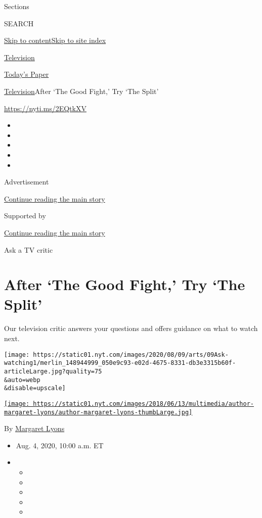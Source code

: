 Sections

SEARCH

\protect\hyperlink{site-content}{Skip to
content}\protect\hyperlink{site-index}{Skip to site index}

\href{https://www.nytimes.com/section/arts/television}{Television}

\href{https://myaccount.nytimes.com/auth/login?response_type=cookie\&client_id=vi}{}

\href{https://www.nytimes.com/section/todayspaper}{Today's Paper}

\href{/section/arts/television}{Television}\textbar{}After `The Good
Fight,' Try `The Split'

\url{https://nyti.ms/2EQtkXV}

\begin{itemize}
\item
\item
\item
\item
\item
\end{itemize}

Advertisement

\protect\hyperlink{after-top}{Continue reading the main story}

Supported by

\protect\hyperlink{after-sponsor}{Continue reading the main story}

Ask a TV critic

\hypertarget{after-the-good-fight-try-the-split}{%
\section{After `The Good Fight,' Try `The
Split'}\label{after-the-good-fight-try-the-split}}

Our television critic answers your questions and offers guidance on what
to watch next.

\texttt{[image: https://static01.nyt.com/images/2020/08/09/arts/09Ask-watching1/merlin\_148944999\_050e9c93-e02d-4675-8331-db3e3315b60f-articleLarge.jpg?quality=75\\\&auto=webp\\\&disable=upscale]}

\href{https://www.nytimes.com/by/margaret-lyons}{\texttt{[image: https://static01.nyt.com/images/2018/06/13/multimedia/author-margaret-lyons/author-margaret-lyons-thumbLarge.jpg]}}

By \href{https://www.nytimes.com/by/margaret-lyons}{Margaret Lyons}

\begin{itemize}
\item
  Aug. 4, 2020, 10:00 a.m. ET
\item
  \begin{itemize}
  \item
  \item
  \item
  \item
  \item
  \end{itemize}
\end{itemize}

